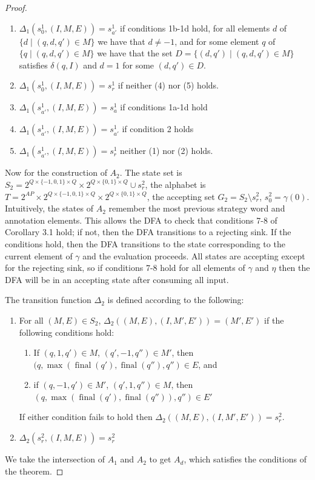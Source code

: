 \documentclass[10pt,a4paper]{amsart}
\theoremstyle{plain}
\theoremstyle{definition}
\theoremstyle{definition}
\DeclareMathOperator{\?}{?}
\DeclareMathOperator{\final}{final}
\begin{document}
\begin{proof}
\begin{enumerate}
\item $\Delta_1(s^1_0,(I,M,E)) = s^1_{a'}$ if conditions 1b-1d hold, for all elements $d$ of $\{d \mid (q,d,q') \in M\}$ we have that $d \neq -1$, and for some element $q$ of $\{q \mid (q,d,q') \in M\}$ we have that the set $D=\{(d,q') \mid (q,d,q') \in M\}$ satisfies $\delta(q,I)$ and $d = 1$
for some $(d,q')\in D$.
\item $\Delta_1(s^1_0,(I,M,E)) = s^1_r$ if neither (4) nor (5) holds.
\item $\Delta_1(s^1_{a'},(I,M,E)) = s^1_a$ if conditions 1a-1d hold
\item $\Delta_1(s^1_{a'},(I,M,E)) = s^1_{a'}$ if condition 2 holds
\item $\Delta_1(s^1_{a'},(I,M,E)) = s^1_r$ neither (1) nor (2) holds.
\end{enumerate}

Now for the construction of $A_2$. The state set is $S_2 = 2^{Q \times \{-1,0,1\} \times Q} \times 2^{Q \times \{0,1\} \times Q} \cup s^2_r$, the alphabet is $T = 2^{AP} \times 2^{Q \times \{-1,0,1\} \times Q} \times 2^{Q \times \{0,1\} \times Q}$, the accepting set $G_2 = S_2 \setminus s^2_r$, $s^2_0 = \gamma(0)$. Intuitively, the states of $A_2$ remember the most previous strategy word and annotation elements. This allows the DFA to check that conditions 7-8 of Corollary 3.1 hold; if not, then the DFA transitions to a rejecting sink. If the conditions hold, then the DFA transitions to the state corresponding to the current element of $\gamma$ and the evaluation proceeds. All states are accepting except for the rejecting sink, so if conditions 7-8 hold for all elements of $\gamma$ and $\eta$ then the DFA will be in an accepting state after consuming all input.

The transition function $\Delta_2$ is defined according to the following:
\begin{enumerate}
\item For all $(M,E) \in S_2$,
$\Delta_2((M,E),(I,M',E')) = (M',E')$ if the following conditions hold:
\begin{enumerate}
\item
If $(q,1,q') \in M$, $(q',-1,q'') \in M'$, then $(q,\max(\final(q'),\final(q''),q'') \in E$, and

\item
if $(q,-1,q') \in M'$, $(q',1,q'') \in M$,
then $(q,\max(\final(q'),\final(q'')),q'') \in E'$

\end{enumerate}
If either condition fails to hold then $\Delta_2((M,E),(I,M',E')) = s^2_r$.

\item $\Delta_2(s^2_r,(I,M,E))=s^2_r$
    \end{enumerate}

We take the intersection of $A_1$ and $A_2$ to get $A_d$, which satisfies the conditions of the theorem.
\end{proof}
\end{document}

